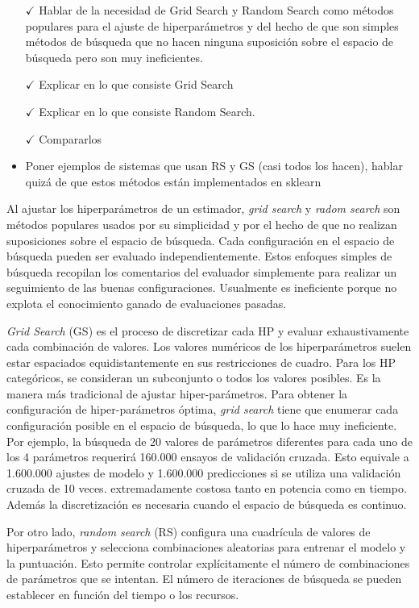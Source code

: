 \begin{itemize}
	\item[$\checkmark$] Hablar de la necesidad de Grid Search y Random Search como métodos populares para el ajuste de hiperparámetros y del hecho de que son simples métodos de búsqueda que no hacen ninguna suposición sobre el espacio de búsqueda pero son muy ineficientes.
	\item[$\checkmark$] Explicar en lo que consiste Grid Search
	\item[$\checkmark$] Explicar en lo que consiste Random Search.
	\item[$\checkmark$] Compararlos
	\item Poner ejemplos de sistemas que usan RS y GS (casi todos los hacen), hablar quizá de que estos métodos están implementados en sklearn
\end{itemize}

Al ajustar los hiperparámetros de un estimador, \textit{grid search} y \textit{radom search} son métodos populares usados por su simplicidad y por el hecho de que no realizan suposiciones sobre el espacio de búsqueda. Cada configuración en el espacio de búsqueda pueden ser evaluado independientemente. Estos enfoques simples de búsqueda recopilan los comentarios del evaluador simplemente para realizar un seguimiento de las buenas configuraciones. Usualmente es ineficiente porque no explota el conocimiento ganado de evaluaciones pasadas.

\textit{Grid Search} (GS) es el proceso de discretizar cada HP y evaluar exhaustivamente cada combinación de valores. Los valores numéricos de los hiperparámetros suelen estar espaciados equidistantemente en sus restricciones de cuadro. Para los HP categóricos, se consideran un subconjunto o todos los valores posibles. Es la manera más tradicional de ajustar hiper-parámetros. Para obtener la configuración de hiper-parámetros óptima, \textit{grid search} tiene que enumerar cada configuración posible en el espacio de búsqueda, lo que lo hace muy ineficiente. Por ejemplo, la búsqueda de 20 valores de parámetros diferentes para cada uno de los 4 parámetros requerirá 160.000 ensayos de validación cruzada. Esto equivale a 1.600.000 ajustes de modelo y 1.600.000 predicciones si se utiliza una validación cruzada de 10 veces. extremadamente costosa tanto en potencia como en tiempo. Además la discretización es necesaria cuando el espacio de búsqueda es continuo.

Por otro lado, \textit{random search} (RS) configura una cuadrícula de valores de hiperparámetros y selecciona combinaciones aleatorias para entrenar el modelo y la puntuación. Esto permite controlar explícitamente el número de combinaciones de parámetros que se intentan. El número de iteraciones de búsqueda se pueden establecer en función del tiempo o los recursos.

